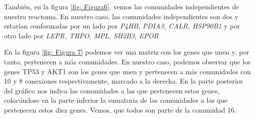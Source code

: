\begin{spacing}{1}
También, en la figura \ref{fig: Figura6}, vemos las comunidades independientes de nuestro reactoma. En nuestro caso, las comunidades independientes son dos y estarían conformadas por un lado por \textit{P4HB, PDIA3, CALR, HSP90B1} y por otro lado por \textit{LEPR, THPO, MPL, SH2B3, EPOR}
\end{spacing}

\begin{minipage}{\linewidth}
	\label{fig: Figura6}
\end{minipage}


\begin{spacing}{1}
	En la figura \ref{fig: Figura 7} podemos ver una matriz con los genes que unen y, por tanto, pertenecen a más comunidades. En nuestro caso, podemos observar que los genes TP53 y AKT1 son los genes que unen y pertenecen a más comunidades con 10 y 8 conexiones respectivamente, marcado a la derecha. En la parte posterior del gráfico nos indica las comunidades a las que pertenecen estos genes, colocándose en la parte inferior la sumatoria de las comunidades a las que pertenecen estos diez genes. Vemos, que todos son parte de la comunidad 16.
\end{spacing}



